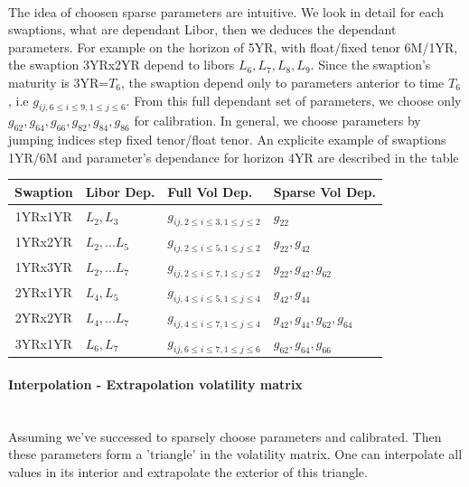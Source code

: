 \documentclass[a4paper,10pt]{article}
\begin{document}
\paragraph{} The idea of choosen sparse parameters are intuitive. We look in detail for each swaptions, what are dependant Libor, then we deduces the dependant parameters. For example on the horizon of 5YR, with float/fixed tenor 6M/1YR, the swaption 3YRx2YR depend to libors $L_6,L_7,L_8,L_9$. Since the swaption's maturity is 3YR=$T_6$, the swaption depend only to parameters anterior to time $T_6$, i.e $g_{ij, 6\leq i\leq 9,1\leq j\leq6}$. From this full dependant set of parameters, we choose only $g_{62},g_{64},g_{66},g_{82},g_{84},g_{86}$ for calibration. In general, we choose parameters by jumping indices step fixed tenor/float tenor. An explicite example of swaptions 1YR/6M and parameter's dependance for horizon 4YR are described in the table
\begin{center}
\begin{tabular}{||c||l|l|l|}
\hline
Swaption & Libor Dep.   & Full Vol Dep. & Sparse Vol Dep. \\
\hline
1YRx1YR  & $L_2, L_3$   & $g_{ij, 2\leq i\leq 3,1\leq j\leq2}$& $g_{22}$\\
\hline
1YRx2YR  & $L_2,...L_5$ & $g_{ij, 2\leq i\leq 5,1\leq j\leq2}$& $g_{22},g_{42}$ \\
\hline
1YRx3YR  & $L_2,...L_7$ & $g_{ij, 2\leq i\leq 7,1\leq j\leq2}$& $g_{22},g_{42},g_{62}$ \\
\hline
2YRx1YR  & $L_4, L_5$   & $g_{ij, 4\leq i\leq 5,1\leq j\leq4}$& $g_{42},g_{44}$ \\
\hline
2YRx2YR  & $L_4,...L_7$ & $g_{ij, 4\leq i\leq 7,1\leq j\leq4}$& $g_{42},g_{44},g_{62},g_{64}$\\
\hline
3YRx1YR  & $L_6, L_7$   & $g_{ij, 6\leq i\leq 7,1\leq j\leq6}$& $g_{62},g_{64},g_{66}$ \\
\hline
\end{tabular} 
\end{center}
\paragraph{Interpolation - Extrapolation volatility matrix}\mbox{}\\
Assuming we've successed to sparsely choose parameters and calibrated. Then these parameters form a 'triangle' in the volatility matrix. One can interpolate all values in its interior and extrapolate the exterior of this triangle.
\end{document}
